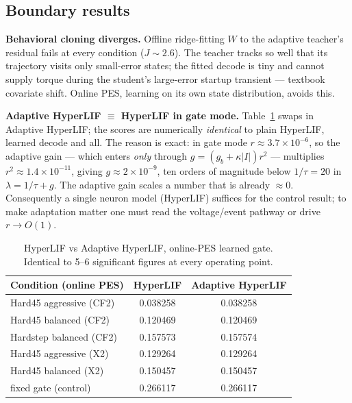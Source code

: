 \documentclass[conference]{IEEEtran}
\begin{document}
\subsection{Boundary results}\label{sec:boundary}
\textbf{Behavioral cloning diverges.} Offline ridge-fitting $W$ to the adaptive
teacher's residual fails at every condition ($J\!\sim\!2.6$). The teacher tracks
so well that its trajectory visits only small-error states; the fitted decode is
tiny and cannot supply torque during the student's large-error startup transient
--- textbook covariate shift. Online PES, learning on its own state
distribution, avoids this.

\textbf{Adaptive HyperLIF $\equiv$ HyperLIF in gate mode.}
Table~\ref{tab:adaptive} swaps in Adaptive HyperLIF; the scores are numerically
\emph{identical} to plain HyperLIF, learned decode and all. The reason is exact:
in gate mode $r\!\approx\!3.7\times10^{-6}$, so the adaptive gain --- which enters
\emph{only} through $g=(g_b{+}\kappa|I|)r^2$ --- multiplies $r^2\!\approx\!
1.4\times10^{-11}$, giving $g\!\approx\!2\times10^{-9}$, ten orders of magnitude
below $1/\tau=20$ in $\lambda=1/\tau+g$. The adaptive gain scales a number that
is already $\approx0$. Consequently a single neuron model (HyperLIF) suffices for
the control result; to make adaptation matter one must read the voltage/event
pathway or drive $r\!\rightarrow\!O(1)$.

\begin{table}[t]
\caption{HyperLIF vs Adaptive HyperLIF, online-PES learned gate. Identical to
5--6 significant figures at every operating point.}
\label{tab:adaptive}
\centering\small
\begin{tabular}{@{}lcc@{}}
\toprule
Condition (online PES) & HyperLIF & Adaptive HyperLIF \\
\midrule
Hard45 aggressive (CF2)  & 0.038258 & 0.038258 \\
Hard45 balanced (CF2)    & 0.120469 & 0.120469 \\
Hardstep balanced (CF2)  & 0.157573 & 0.157574 \\
Hard45 aggressive (X2)   & 0.129264 & 0.129264 \\
Hard45 balanced (X2)     & 0.150457 & 0.150457 \\
fixed gate (control)     & 0.266117 & 0.266117 \\
\bottomrule
\end{tabular}
\end{table}

\end{document}
